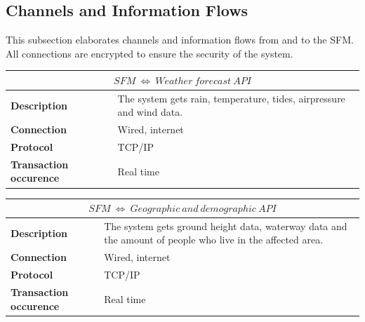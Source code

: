 \subsection{Channels and Information Flows}
\label{subsec:channels-information-flows}
This subsection elaborates channels and information flows from and to the \gls{SFM}. All connections are encrypted to ensure the security of the system.

\begin{table}[!htbp]
	\centering
	\begin{tabular}{L{} L{}}
		\toprule
		 \\ \midrule
		\textbf{Description}           & The system gets rain, temperature, tides, airpressure and wind data. \\
		\textbf{Connection}            & Wired, internet                                                      \\
		\textbf{Protocol}              & TCP/IP                                                               \\
		\textbf{Transaction occurence} & Real time                                                            \\
		\bottomrule
	\end{tabular}
\end{table}

\begin{table}[!htbp]
	\centering
	\begin{tabular}{L{} L{}}
		\toprule
		 \\ \midrule
		\textbf{Description}           & The system gets ground height data, waterway data and the amount of people who live in the affected area. \\
		\textbf{Connection}            & Wired, internet                                                                                           \\
		\textbf{Protocol}              & TCP/IP                                                                                                    \\
		\textbf{Transaction occurence} & Real time                                                                                                 \\
		\bottomrule
	\end{tabular}
\end{table}

